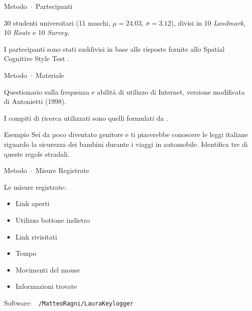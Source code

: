 

\begin{frame}[plain]{\alert{Metodo}~$\cdot$~Partecipanti}
\label{frm:metodo:1}


  30 studenti universitari (11 maschi, $\mu = 24.03$, $\sigma = 3.12$), divisi in
  10 \emph{Landmark}, 10 \emph{Route} e 10 \emph{Survey}.

  \vspace{1em}

  I partecipanti sono stati suddivisi in base alle risposte fornite allo \alert{Spatial Cognitive
  Style Test} \parencite{nori2006predicting}.


\end{frame}

\begin{frame}[plain]{\alert{Metodo}~$\cdot$~Materiale}
\label{frm:metodo:2}

    \alert{Questionario} sulla frequenza e abilità di utilizzo di Internet, versione modificata di Antonietti (1998).

    \vspace{1cm}

    I \alert{compiti di ricerca} utilizzati sono quelli formulati da \textcite{kinley2010impact}.

    \vspace{0.25cm}

    \begin{alertblock}{Esempio}
      Sei da poco diventato genitore e ti piacerebbe conoscere le leggi italiane riguardo la sicurezza
      dei bambini durante i viaggi in automobile. Identifica tre di queste regole stradali.
    \end{alertblock}
\end{frame}

\begin{frame}[plain]{\alert{Metodo}~$\cdot$~Misure Registrate}
\label{frm:metodo:3}

 \begin{block}{Le misure registrate:}
  \begin{itemize} \itemsep1em
    \item[\faHandOUp]       Link aperti
    \item[\faArrowLeft]     Utilizzo bottone indietro
    \item[\faLink]          Link rivisitati
    \item[\faHourglassHalf] Tempo
    \item[\faMousePointer]  Movimenti del mouse
    \item[\faPencilSquareO]  Informazioni trovate
  \end{itemize}
  \end{block}
 \vspace{1em}
Software:~\faGithub~\texttt{/MatteoRagni/LauraKeylogger}
\end{frame}
